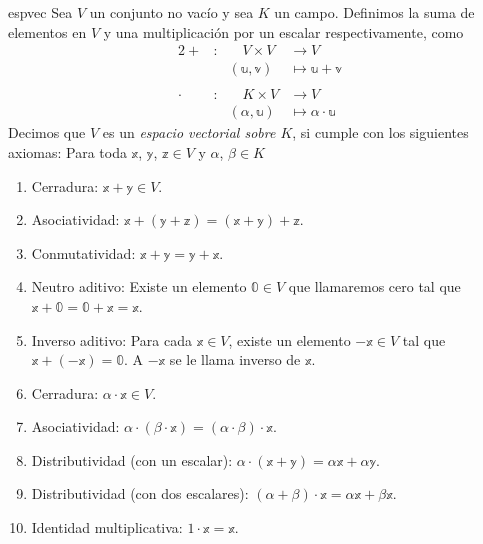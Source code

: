\begin{definicion}{}{espvec}
    Sea $V$ un conjunto no vacío y sea $K$ un campo. Definimos la suma de elementos en $V$ y una multiplicación por un escalar respectivamente, como
    \begin{alignat*}{2}
        + &: & \quad V \times V & \longrightarrow V \\
        & & (\mathbb{u}, \mathbb{v}) & \longmapsto \mathbb{u} + \mathbb{v} \\
        & \\
        \cdot &: & \quad K \times V & \longrightarrow V \\
        & & (\alpha, \mathbb{u}) & \longmapsto \alpha \cdot \mathbb{u}
    \end{alignat*}
    Decimos que $V$ es un \emph{espacio vectorial sobre $K$}, si cumple con los siguientes axiomas: Para toda $\mathbb{x}$, $\mathbb{y}$, $\mathbb{z} \in V$ y $\alpha$, $\beta \in K$
    \begin{enumerate}[label=\roman*), topsep=6pt, itemsep=0pt]
        \item Cerradura: $\mathbb{x} + \mathbb{y} \in V$.
        \item Asociatividad: $\mathbb{x} + (\mathbb{y} + \mathbb {z}) = (\mathbb{x} + \mathbb{y}) + \mathbb{z}$.\newpage
        \item Conmutatividad: $\mathbb{x} + \mathbb{y} = \mathbb{y} + \mathbb{x}$.
        \item Neutro aditivo: Existe un elemento $\mathbb{0} \in V$ que llamaremos cero tal que $\mathbb{x} + \mathbb{0} = \mathbb{0} + \mathbb{x} = \mathbb{x}$.
        \item Inverso aditivo: Para cada $\mathbb{x} \in V$, existe un elemento $-\mathbb{x} \in V$ tal que $\mathbb{x} + (-\mathbb{x}) = \mathbb{0}$. A $-\mathbb{x}$ se le llama inverso de $\mathbb{x}$.
        \item Cerradura: $\alpha \cdot \mathbb{x} \in V$.
        \item Asociatividad: $\alpha \cdot (\beta \cdot \mathbb{x}) = (\alpha \cdot \beta) \cdot \mathbb{x}$.
        \item Distributividad (con un escalar): $\alpha \cdot (\mathbb{x} + \mathbb{y}) = \alpha \mathbb{x} + \alpha \mathbb{y}$.
        \item Distributividad (con dos escalares): $(\alpha + \beta) \cdot \mathbb{x} = \alpha \mathbb{x} + \beta \mathbb{x}$.
        \item Identidad multiplicativa: $1 \cdot \mathbb{x} = \mathbb{x}$.
    \end{enumerate}
\end{definicion}

